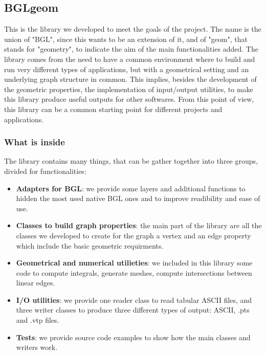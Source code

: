 \documentclass[11pt]{article} %
\begin{document}
	\subsection{BGLgeom}
	This is the library we developed to meet the goals of the project. The name is the union of "BGL", since this wants to be an extension of it, and of "geom", that stands for "geometry", to indicate the aim of the main functionalities added. 
	\newline\newline
	The library comes from the need to have a common environment where to build and run very different types of applications, but with a geometrical setting and an underlying graph structure in common. This implies, besides the development of the geometric properties, the implementation of input/output utilities, to make this library produce useful outputs for other softwares. From this point of view, this library can be a common starting point for different projects and applications.
	\newline\newline	
	
		\subsubsection{What is inside}
		The library contains many things, that can be gather together into three groups, divided for functionalities:
		\begin{itemize}
			\item \textbf{Adapters for BGL}: we provide some layers and additional functions to hidden the most used native BGL ones and to improve readibility and ease of use.
			\item \textbf{Classes to build graph properties}: the main part of the library are all the classes we developed to create for the graph a vertex and an edge property which include the basic geometric requirments.
			\item \textbf{Geometrical and numerical utilieties}: we included in this library some code to compute integrals, generate meshes, compute intersections between linear edges.
			\item \textbf{I/O utilities}: we provide one reader class to read tabular ASCII files, and three writer classes to produce three different types of output: ASCII, .pts and .vtp files.
			\item \textbf{Tests}: we provide source code examples to show how the main classes and writers work.
		\end{itemize}
	
\end{document}
